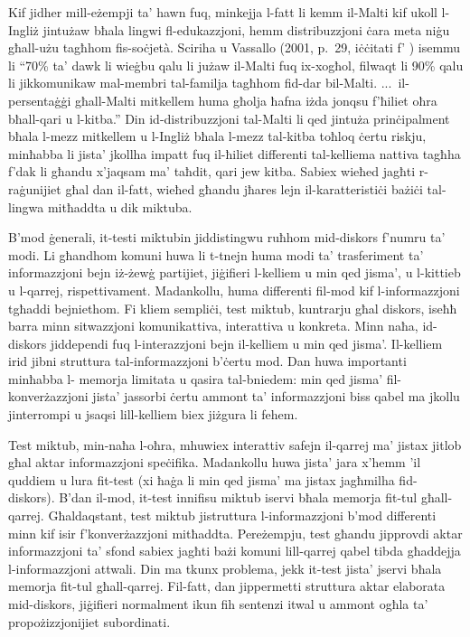 \begin{multicols}{2}
Kif jidher mill-eżempji ta’ hawn fuq, minkejja l-fatt li kemm il-Malti kif ukoll l-Ingliż jintużaw bħala lingwi fl-edukazzjoni, hemm distribuzzjoni ċara meta niġu għall-użu tagħhom fis-soċjetà. Sciriha u Vassallo (2001, p.~29, iċċitati f’ \cite{Fabri:2011a}) isemmu li ``70\% ta’ dawk li wieġbu qalu li jużaw il-Malti fuq ix-xogħol, filwaqt li 90\% qalu li jikkomunikaw mal-membri tal-familja tagħhom fid-dar bil-Malti. ...~il-persentaġġi għall-Malti mitkellem huma għolja ħafna iżda jonqsu f’ħiliet oħra bħall-qari u l-kitba.'' 
Din id-distribuzzjoni tal-Malti li qed jintuża prinċipalment bħala l-mezz mitkellem u l-Ingliż bħala l-mezz tal-kitba toħloq ċertu riskju, minħabba li jista’ jkollha impatt fuq il-ħiliet differenti tal-kelliema nattiva tagħha f’dak li għandu x’jaqsam ma’ taħdit, qari jew kitba. Sabiex wieħed jagħti r-raġunijiet għal dan il-fatt, wieħed għandu jħares lejn il-karatteristiċi bażiċi tal-lingwa mitħaddta u dik miktuba.

B’mod ġenerali, it-testi miktubin jiddistingwu ruħhom mid-diskors f’numru ta’ modi. Li għandhom komuni huwa li t-tnejn huma modi ta’ trasferiment ta’ informazzjoni bejn iż-żewġ partijiet, jiġifieri l-kelliem u min qed jisma’, u l-kittieb u l-qarrej, rispettivament. Madankollu, huma differenti fil-mod kif l-informazzjoni tgħaddi bejniethom. Fi kliem sempliċi, test miktub, kuntrarju għal diskors, iseħħ barra minn sitwazzjoni komunikattiva, interattiva u konkreta. Minn naħa, id-diskors jiddependi fuq l-interazzjoni bejn il-kelliem u min qed jisma’. Il-kelliem irid jibni struttura tal-informazzjoni b’ċertu mod. Dan huwa importanti minħabba l- memorja limitata u qasira tal-bniedem: min qed jisma’ fil-konverżazzjoni jista’ jassorbi ċertu ammont ta’ informazzjoni biss qabel ma jkollu jinterrompi u jsaqsi lill-kelliem biex jiżgura li fehem.

Test miktub, min-naħa l-oħra, mhuwiex interattiv safejn il-qarrej ma’ jistax jitlob għal aktar informazzjoni speċifika. Madankollu huwa jista’ jara x'hemm 'il quddiem u lura fit-test (xi ħaġa li min qed jisma’ ma jistax jagħmilha fid-diskors). B'dan il-mod, it-test innifisu miktub iservi bħala memorja fit-tul għall-qarrej. Għaldaqstant, test miktub jistruttura l-informazzjoni b’mod differenti minn kif isir f’konverżazzjoni mitħaddta. Pereżempju, test għandu jipprovdi aktar informazzjoni ta’ sfond sabiex jagħti bażi komuni lill-qarrej qabel tibda għaddejja l-informazzjoni attwali. Din ma tkunx problema, jekk it-test jista’ jservi bħala memorja fit-tul għall-qarrej. Fil-fatt, dan jippermetti struttura aktar elaborata mid-diskors, jiġifieri normalment ikun fih sentenzi itwal u ammont ogħla ta’ propożizzjonijiet subordinati.


\end{multicols}
